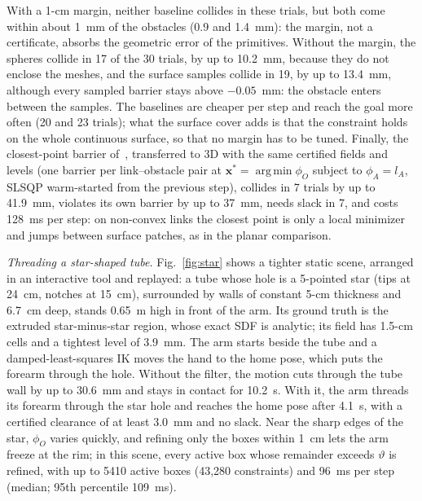 \documentclass[journal]{IEEEtran}
\theoremstyle{definition}
\DeclareMathOperator*{\argmin}{arg\,min}
\begin{document}
With a 1-cm margin, neither baseline collides in these trials, but both come within about 1~mm of
the obstacles (0.9 and 1.4~mm): the margin, not a certificate, absorbs the geometric error of the
primitives. Without the margin, the spheres collide in 17 of the 30 trials, by up to 10.2~mm,
because they do not enclose the meshes, and the surface samples collide in 19, by up to 13.4~mm,
although every sampled barrier stays above $-0.05$~mm: the obstacle enters between the samples. The baselines are
cheaper per step and reach the goal more often (20 and 23 trials); what the surface cover adds is
that the constraint holds on the whole continuous surface, so that no margin has to be tuned.
Finally, the closest-point barrier of~\cite{jo2026geometry}, transferred to 3D with the same
certified fields and levels (one barrier per link--obstacle pair at
$\mathbf x^\ast=\argmin\phi_O$ subject to $\phi_A=l_A$, SLSQP warm-started from the previous step),
collides in 7 trials by up to 41.9~mm, violates its own barrier by up to 37~mm, needs slack in 7, and
costs 128~ms per step:
on non-convex links the closest point is only a local minimizer and jumps between surface patches,
as in the planar comparison.

\emph{Threading a star-shaped tube.} Fig.~\ref{fig:star} shows a tighter static scene, arranged in an
interactive tool and replayed: a tube whose hole is a 5-pointed star (tips at 24~cm, notches at
15~cm), surrounded by walls of constant 5-cm thickness and 6.7~cm deep, stands 0.65~m high in front of
the arm. Its ground truth is the extruded star-minus-star region, whose exact SDF is analytic; its
field has 1.5-cm cells and a tightest level of 3.9~mm. The arm starts beside the tube and a
damped-least-squares IK moves the hand to the home pose, which puts the forearm through the hole.
Without the filter, the motion cuts through the tube wall by up to 30.6~mm and stays in contact for
10.2~s. With it, the arm threads its forearm through the star hole and reaches the home pose after
4.1~s, with a certified clearance of at least 3.0~mm and no slack. Near the sharp edges of the star,
$\phi_O$ varies quickly, and refining only the boxes within 1~cm lets the arm freeze at the rim; in
this scene, every active box whose remainder exceeds $\vartheta$ is refined, with up to 5410 active
boxes (43{,}280 constraints) and 96~ms per step (median; 95th percentile 109~ms).
\end{document}
